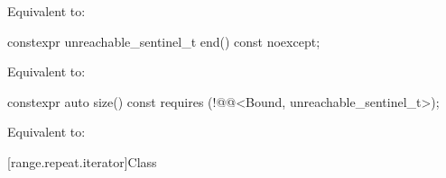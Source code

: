 \begin{itemdescr}
\pnum
\effects
Equivalent to: 
\end{itemdescr}

%
\begin{itemdecl}
constexpr unreachable_sentinel_t end() const noexcept;
\end{itemdecl}

\begin{itemdescr}
\pnum
\effects
Equivalent to: 
\end{itemdescr}

%
\begin{itemdecl}
constexpr auto size() const requires (!@@<Bound, unreachable_sentinel_t>);
\end{itemdecl}

\begin{itemdescr}
\pnum
\effects
Equivalent to: 
\end{itemdescr}

[range.repeat.iterator]{Class }

